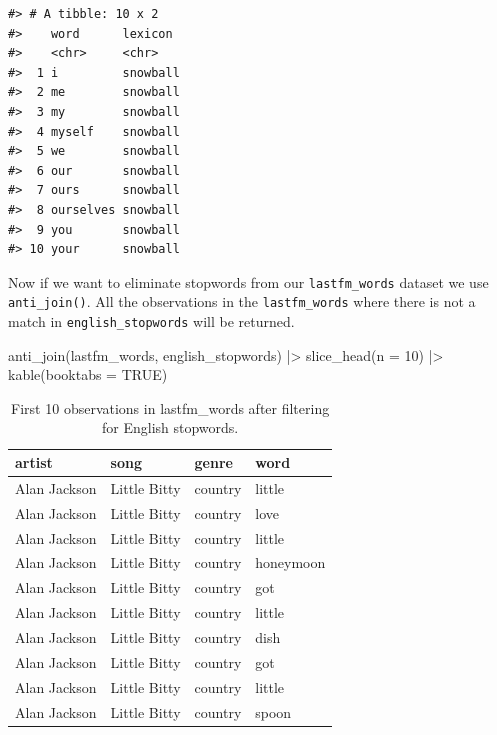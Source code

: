 \documentclass[
  letterpaper,
]{latex/krantz}
\newenvironment{Shaded}{\begin{snugshade}}{\end{snugshade}}
\newcommand{\AttributeTok}[1]{\textcolor[rgb]{0.40,0.45,0.13}{#1}}
\newcommand{\ConstantTok}[1]{\textcolor[rgb]{0.56,0.35,0.01}{#1}}
\newcommand{\DecValTok}[1]{\textcolor[rgb]{0.68,0.00,0.00}{#1}}
\newcommand{\FunctionTok}[1]{\textcolor[rgb]{0.28,0.35,0.67}{#1}}
\newcommand{\NormalTok}[1]{\textcolor[rgb]{0.00,0.23,0.31}{#1}}
\newcommand{\SpecialCharTok}[1]{\textcolor[rgb]{0.37,0.37,0.37}{#1}}
\begin{document}
\begin{verbatim}
#> # A tibble: 10 x 2
#>    word      lexicon 
#>    <chr>     <chr>   
#>  1 i         snowball
#>  2 me        snowball
#>  3 my        snowball
#>  4 myself    snowball
#>  5 we        snowball
#>  6 our       snowball
#>  7 ours      snowball
#>  8 ourselves snowball
#>  9 you       snowball
#> 10 your      snowball
\end{verbatim}

Now if we want to eliminate stopwords from our \texttt{lastfm\_words}
dataset we use \texttt{anti\_join()}. All the observations in the
\texttt{lastfm\_words} where there is not a match in
\texttt{english\_stopwords} will be returned.

\begin{Shaded}
\begin{Highlighting}[]
\FunctionTok{anti\_join}\NormalTok{(lastfm\_words, english\_stopwords) }\SpecialCharTok{|\textgreater{}} 
  \FunctionTok{slice\_head}\NormalTok{(}\AttributeTok{n =} \DecValTok{10}\NormalTok{) }\SpecialCharTok{|\textgreater{}} 
  \FunctionTok{kable}\NormalTok{(}\AttributeTok{booktabs =} \ConstantTok{TRUE}\NormalTok{)}
\end{Highlighting}
\end{Shaded}

\hypertarget{tbl-td-lastfm-words-stopwords-anti-join}{}
\begin{table}
\caption{\label{tbl-td-lastfm-words-stopwords-anti-join}First 10 observations in lastfm\_words after filtering for English
stopwords. }\tabularnewline

\centering
\begin{tabular}{llll}
\toprule
artist & song & genre & word\\
\midrule
Alan Jackson & Little Bitty & country & little\\
Alan Jackson & Little Bitty & country & love\\
Alan Jackson & Little Bitty & country & little\\
Alan Jackson & Little Bitty & country & honeymoon\\
Alan Jackson & Little Bitty & country & got\\
\addlinespace
Alan Jackson & Little Bitty & country & little\\
Alan Jackson & Little Bitty & country & dish\\
Alan Jackson & Little Bitty & country & got\\
Alan Jackson & Little Bitty & country & little\\
Alan Jackson & Little Bitty & country & spoon\\
\bottomrule
\end{tabular}
\end{table}
\end{document}
